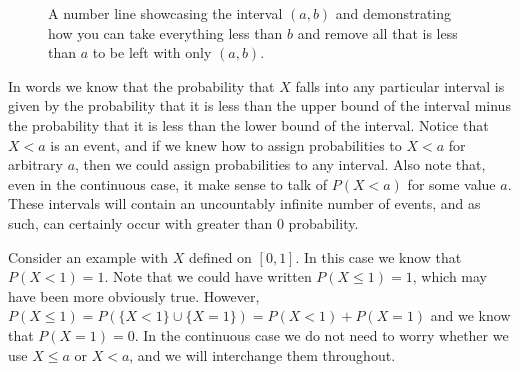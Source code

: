 \documentclass[
  letterpaper,
  DIV=11,
  numbers=noendperiod]{scrreprt}
\theoremstyle{definition}
\theoremstyle{definition}
\theoremstyle{definition}
\theoremstyle{remark}
\begin{document}
\begin{figure}[H]

\caption{\label{fig-number-line}A number line showcasing the interval
\((a,b)\) and demonstrating how you can take everything less than \(b\)
and remove all that is less than \(a\) to be left with only \((a,b)\).}


\end{figure}%

In words we know that the probability that \(X\) falls into any
particular interval is given by the probability that it is less than the
upper bound of the interval minus the probability that it is less than
the lower bound of the interval. Notice that \(X < a\) is an event, and
if we knew how to assign probabilities to \(X<a\) for arbitrary \(a\),
then we could assign probabilities to any interval. Also note that, even
in the continuous case, it make sense to talk of \(P(X < a)\) for some
value \(a\). These intervals will contain an uncountably infinite number
of events, and as such, can certainly occur with greater than \(0\)
probability.

Consider an example with \(X\) defined on \([0,1]\). In this case we
know that \(P(X<1)=1\). Note that we could have written
\(P(X \leq 1) = 1\), which may have been more obviously true. However,
\(P(X\leq 1) = P(\{X<1\}\cup\{X=1\}) = P(X<1) + P(X=1)\) and we know
that \(P(X=1)=0\). In the continuous case we do not need to worry
whether we use \(X\leq a\) or \(X < a\), and we will interchange them
throughout.
\end{document}
